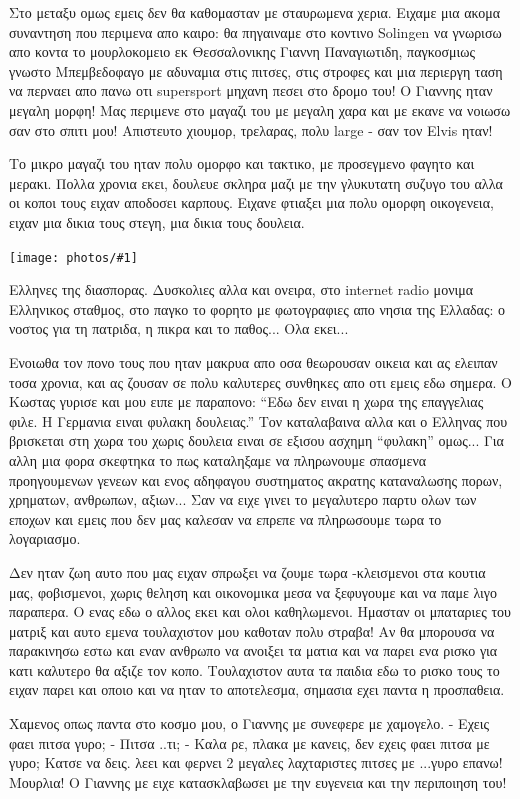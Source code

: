 \documentclass[11pt, letterpaper]{book}
\newcommand\photo[1]{\begin{center}\noindent\texttt{[image: photos/\#1]}\end{center}}
\begin{document}
Στο μεταξυ ομως εμεις δεν θα καθομασταν με σταυρωμενα χερια. 
Ειχαμε μια ακομα συναντηση που περιμενα απο καιρο: θα πηγαιναμε στο κοντινο Solingen να γνωρισω απο κοντα το μουρλοκομειο εκ Θεσσαλονικης Γιαννη Παναγιωτιδη, παγκοσμιως γνωστο Μπεμβεδοφαγο με αδυναμια στις πιτσες, στις στροφες και μια περιεργη ταση να περναει απο πανω οτι supersport μηχανη πεσει στο δρομο του! 
Ο Γιαννης ηταν μεγαλη μορφη! Μας περιμενε στο μαγαζι του με μεγαλη χαρα και με εκανε να νοιωσω σαν στο σπιτι μου! Απιστευτο χιουμορ, τρελαρας, πολυ large - σαν τον Elvis ηταν!  

Το μικρο μαγαζι του ηταν πολυ ομορφο και τακτικο, με προσεγμενο φαγητο και μερακι. Πολλα χρονια εκει, δουλευε σκληρα μαζι με την γλυκυτατη συζυγο του αλλα οι κοποι τους ειχαν αποδοσει καρπους. Ειχανε φτιαξει μια πολυ ομορφη οικογενεια, ειχαν μια δικια τους στεγη, μια δικια τους δουλεια. 

\photo{128.jpg}

Ελληνες της διασπορας. Δυσκολιες αλλα και ονειρα, στο internet radio μονιμα Ελληνικος σταθμος, στο παγκο το φορητο με φωτογραφιες απο νησια της Ελλαδας: ο νοστος για τη πατριδα, η πικρα και το παθος... Ολα εκει...

Ενοιωθα τον πονο τους που ηταν μακρυα απο οσα θεωρουσαν οικεια και ας ελειπαν τοσα χρονια, και ας ζουσαν σε πολυ καλυτερες συνθηκες απο οτι εμεις εδω σημερα. 
Ο Κωστας γυρισε και μου ειπε με παραπονο: ``Εδω δεν ειναι η χωρα της επαγγελιας φιλε. Η Γερμανια ειναι φυλακη δουλειας.''
Τον καταλαβαινα αλλα και ο Ελληνας που βρισκεται στη χωρα του χωρις δουλεια ειναι σε εξισου ασχημη ``φυλακη'' ομως... 
Για αλλη μια φορα σκεφτηκα το πως καταληξαμε να πληρωνουμε σπασμενα προηγουμενων γενεων και ενος αδηφαγου συστηματος ακρατης καταναλωσης πορων, χρηματων, ανθρωπων, αξιων... Σαν να ειχε γινει το μεγαλυτερο παρτυ ολων των εποχων και εμεις που δεν μας καλεσαν να επρεπε να πληρωσουμε τωρα το λογαριασμο.

Δεν ηταν ζωη αυτο που μας ειχαν σπρωξει να ζουμε τωρα -κλεισμενοι στα κουτια μας, φοβισμενοι, χωρις θεληση και οικονομικα μεσα να ξεφυγουμε και να παμε λιγο παραπερα. Ο ενας εδω ο αλλος εκει και ολοι καθηλωμενοι. Ημασταν οι μπαταριες του ματριξ και αυτο εμενα τουλαχιστον μου καθοταν πολυ στραβα! Αν θα μπορουσα να παρακινησω εστω και εναν ανθρωπο να ανοιξει τα ματια και να παρει ενα ρισκο για κατι καλυτερο θα αξιζε τον κοπο.
Τουλαχιστον αυτα τα παιδια εδω το ρισκο τους το ειχαν παρει και οποιο και να ηταν το αποτελεσμα, σημασια εχει παντα η προσπαθεια.

Χαμενος οπως παντα στο κοσμο μου, ο Γιαννης με συνεφερε με χαμογελο. 
- Εχεις φαει πιτσα γυρο;
- Πιτσα ..τι;
- Καλα ρε, πλακα με κανεις, δεν εχεις φαει πιτσα με γυρο; Κατσε να δεις. λεει και φερνει 2 μεγαλες λαχταριστες πιτσες με ...γυρο επανω! Μουρλια! Ο Γιαννης με ειχε κατασκλαβωσει με την ευγενεια και την περιποιηση του!
\end{document}
